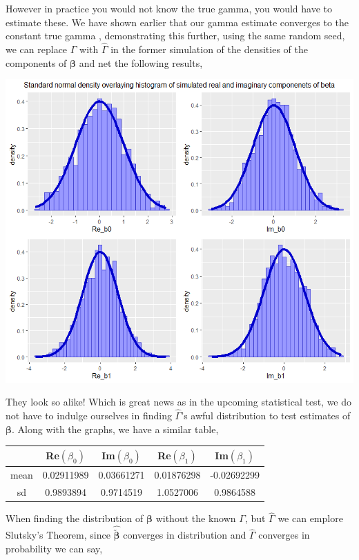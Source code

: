 \documentclass[honours,12pt]{unswthesis}
\numberwithin{equation}{section}
\begin{document}
\noindent However in practice you would not know the true gamma, you would have to estimate these. We have shown earlier that our gamma estimate converges to the constant true gamma , demonstrating this further, using the same random seed, we can replace $\Gamma$ with $\widehat{\Gamma}$ in the former simulation of the densities of the components of $\bm{\beta}$ and net the following results,

\includegraphics[width = \textwidth]{graphics/density_gamma_est}

\noindent They look so alike! Which is great news as in the upcoming statistical test, we do not have to indulge ourselves in finding $\widehat{\Gamma}$'s awful distribution to test estimates of $\bm{\beta}$. Along with the graphs, we have a similar table,

\begin{center}
	\begin{tabular}{|c||c|c|c|c|}
	\hline
	& Re$(\beta_{0})$ & Im$(\beta_{0})$ & Re$(\beta_{1})$ & Im$(\beta_{1})$ \\
	\hline \hline
	mean & 0.02911989 & 0.03661271 &  0.01876298 & -0.02692299 \\
	\hline
	sd & 0.9893894  & 0.9714519 & 1.0527006 & 0.9864588 \\
	\hline
	\end{tabular}
\end{center}

\noindent When finding the distribution of $\bm{\beta}$ without the known $\Gamma$, but $\widehat{\Gamma}$ we can emplore Slutsky's Theorem, since $\widehat{\utilde{\bm{\beta}}}$ converges in distribution and $\widehat{\Gamma}$ converges in probability we can say,
\end{document}
